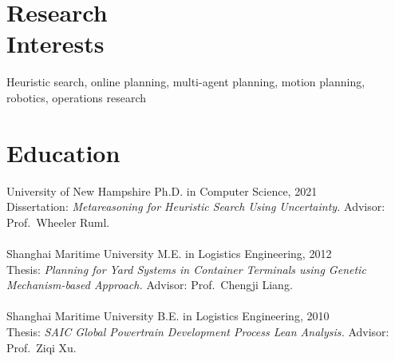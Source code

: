 \documentclass[margin, 10pt]{res} %
\begin{document}
\begin{resume}

 
\section{Research\\ Interests}  

Heuristic search, online planning, multi-agent planning, motion planning, robotics, operations research\\
\section{Education}

{\sc University of New Hampshire} \hfill Ph.D. in Computer Science, 2021\\
Dissertation: {\sl Metareasoning for Heuristic Search Using Uncertainty.} Advisor: Prof.\ Wheeler Ruml.\\~\\
{\sc Shanghai Maritime University} \hfill M.E. in Logistics Engineering, 2012\\
Thesis: {\sl Planning for Yard Systems in Container
  Terminals using Genetic Mechanism-based Approach.}
Advisor: Prof.\ Chengji Liang. \\~\\
{\sc Shanghai Maritime University} \hfill B.E. in Logistics Engineering, 2010\\
Thesis: {\sl SAIC Global Powertrain Development Process Lean
  Analysis.} Advisor: Prof.\ Ziqi Xu.


\end{resume}
\end{document}
